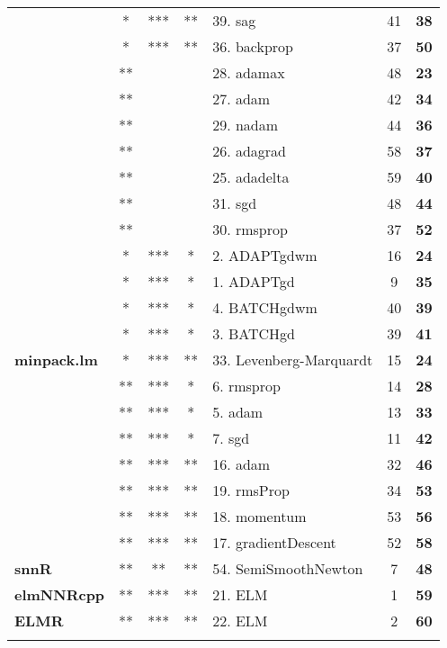 \begin{Schunk}
\begin{table}
\begin{tabular}[t]{>{\bfseries}lccclc>{\bfseries}c}
 & * & *** & ** & 39. sag & 41 & 38\\

\multirow{-5}{*}{\raggedright\arraybackslash neuralnet} & * & *** & ** & 36. backprop & 37 & 50\\
\cmidrule{1-7}
 & ** &  &  & 28. adamax & 48 & 23\\

 & ** &  &  & 27. adam & 42 & 34\\

 & ** &  &  & 29. nadam & 44 & 36\\

 & ** &  &  & 26. adagrad & 58 & 37\\

 & ** &  &  & 25. adadelta & 59 & 40\\

 & ** &  &  & 31. sgd & 48 & 44\\

\multirow{-7}{*}{\raggedright\arraybackslash keras} & ** &  &  & 30. rmsprop & 37 & 52\\
\cmidrule{1-7}
 & * & *** & * & 2. ADAPTgdwm & 16 & 24\\

 & * & *** & * & 1. ADAPTgd & 9 & 35\\

 & * & *** & * & 4. BATCHgdwm & 40 & 39\\

\multirow{-4}{*}{\raggedright\arraybackslash AMORE} & * & *** & * & 3. BATCHgd & 39 & 41\\
\cmidrule{1-7}
minpack.lm & * & *** & ** & 33. Levenberg-Marquardt & 15 & 24\\
\cmidrule{1-7}
 & ** & *** & * & 6. rmsprop & 14 & 28\\

 & ** & *** & * & 5. adam & 13 & 33\\

\multirow{-3}{*}{\raggedright\arraybackslash ANN2} & ** & *** & * & 7. sgd & 11 & 42\\
\cmidrule{1-7}
 & ** & *** & ** & 16. adam & 32 & 46\\

 & ** & *** & ** & 19. rmsProp & 34 & 53\\

 & ** & *** & ** & 18. momentum & 53 & 56\\

\multirow{-4}{*}{\raggedright\arraybackslash deepdive} & ** & *** & ** & 17. gradientDescent & 52 & 58\\
\cmidrule{1-7}
snnR & ** & ** & ** & 54. SemiSmoothNewton & 7 & 48\\
\cmidrule{1-7}
elmNNRcpp & ** & *** & ** & 21. ELM & 1 & 59\\
\cmidrule{1-7}
ELMR & ** & *** & ** & 22. ELM & 2 & 60\\
\bottomrule
\multicolumn{7}{l}{\textit{Note: } Statistics over 10 runs.}\\
\end{tabular}
\end{table}

\end{Schunk}

